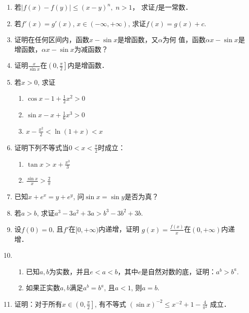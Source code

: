 \begin{ex}
\begin{enumerate}
    \item     若$|f(x)-f(y)|\le (x-y)^n,\; n>1$，
   求证$f$是一常数．
    \item 若$f'(x)=g'(x)$, $x\in(-\infty,+\infty)$, 求证$f(x)=g (x) +c$.
    \item 证明在任何区间内，函数$x-\sin x$是增函数，又$\alpha$为何
    值，函数$\alpha x-\sin x$是增函数，$\alpha x-\sin x$为减函数？
    \item 证明$\frac{x}{\sin x}$在$\left(0,\frac{\pi}{2}\right]$内是增函数．
    \item 若$x>0$, 求证
\begin{multicols}{2}
  \begin{enumerate}
\item  $\cos x-1+\frac{1}{2}x^2> 0$
\item $\sin x-x+\frac{1}{6}x^3> 0$
\item  $x-\frac{x^2}{2}<\ln (1+x)<x$
\end{enumerate}  
\end{multicols}

\item 证明下列不等式当$0<x<\frac{\pi}{2}$时成立：
\begin{multicols}{2}
    \begin{enumerate}
        \item $\tan x> x+\frac{x^3}{3}$
        \item $\frac{\sin x}{x}> \frac{2}{\pi}$
    \end{enumerate}
\end{multicols}

\item 已知$x+e^x=y+e^y$, 问$\sin x=\sin y$是否为真？
\item 若$a>b$, 求证$a^3-3a^2+3a>b^3-3b^2+3b$.
\item 设$f(0)=0$, 且$f'$在$[0,+\infty)$内递增，证明
$ g(x) =\frac{f (x)}{x}$在$(0,+\infty)$内递增．
\item 
\begin{enumerate}
    \item 已知$a,b$为实数，并且$e<a<b$，其中$e$是自然对数的底，证明：$a^b>b^a$.
    \item 如果正实数$a,b$满足$a^b=b^a$, 且$a<1$, 则$a=b$.
\end{enumerate}

\item 证明：对于所有$x\in\left(0,\frac{\pi}{2}\right]$, 有不等式
$(\sin x)^{-2}\le x^{-2}+1-\frac{4}{\pi^2}$
成立．
\end{enumerate}
\end{ex}


